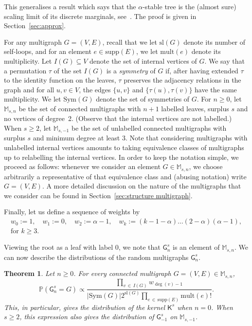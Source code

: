 \documentclass[10pt]{amsart}
\newtheorem{theo}{Theorem}[section]
\theoremstyle{definition}\newtheorem{defi}[theo]{Definition}\newtheorem{rema}[theo]{Remark}\newtheorem{exam}[theo]{Example}\newtheorem{exem}[theo]{Example}\newtheorem{nota}[theo]{Notation}
\newcommand{\abs}[1]{\left\lvert#1\right\rvert}
\newcommand{\Pp}[1]{\mathbb{P} \left(#1\right)}
\renewcommand{\subset}{\subseteq}
\newcommand{\supp}{\mathrm{supp}}
\newcommand{\sll}{\mathrm{sl}}
\newcommand{\Sym}{\mathrm{Sym}}
\newcommand{\mult}{\mathrm{mult}}
\newcommand{\sG}{\mathsf{G}}
\newcommand{\sK}{\mathsf{K}}
\newcommand{\M}{\mathbb{M}}
\begin{document}
This generalises a result which says that the $\alpha$-stable tree is the (almost sure) scaling limit of its discrete marginals, see~\cite{CurienHaas,Marchal}. The proof is given in Section~\ref{sec:approx}.

For any multigraph $G=(V,E)$, recall that we let $\sll(G)$ denote its number of self-loops, and for an element $e \in \supp(E)$, we let $\mult(e)$ denote its multiplicity. Let $I(G) \subset V$ denote the set of internal vertices of $G$. We say that a permutation $\tau$ of the set $I(G)$ is a \emph{symmetry} of $G$ if, after having extended $\tau$ to the identity function on the leaves, $\tau$ preserves the adjacency relations in the graph and for all $u,v \in V$, the edges $\{u,v\}$ and $\{\tau(u),\tau(v)\}$ have the same multiplicity. We let $\Sym(G)$ denote the set of symmetries of $G$. For $n \ge 0$, let $\M_{s,n}$ be the set of connected multigraphs with $n+1$ labelled leaves, surplus $s$ and no vertices of degree~2. (Observe that the internal vertices are not labelled.) When $s\geq 2$, let $\M_{s,-1}$ be the set of unlabelled connected multigraphs with surplus $s$ and minimum degree at least 3. Note that considering multigraphs with unlabelled internal vertices amounts to taking equivalence classes of multigraphs up to relabelling the internal vertices. In order to keep the notation simple, we proceed as follows: whenever we consider an element $G\in \M_{s,n}$, we choose arbitrarily a representative of that equivalence class and (abusing notation) write $G=(V,E)$. A more detailed discussion on the nature of the multigraphs that we consider can be found in Section~\ref{sec:structure multigraph}.

Finally, let us define a sequence of weights by
\begin{multline}\label{Marchal's weights}
w_0:=1, \quad w_1:=0, \quad w_2:=\alpha-1,\quad w_k:=(k-1-\alpha)\dots(2-\alpha)(\alpha-1), \\ \text{for }k\geq 3.
\end{multline}


Viewing the root as a leaf with label $0$, we note that $\sG_{n}^s$ is an element of $\M_{s,n}$. We can now describe the distributions of the random multigraphs $\sG_{n}^s$.


\begin{theo}\label{th:distr_marginals}
Let $n\geq0$. For every connected multigraph $G=(V,E) \in \M_{s,n}$,
\[
\Pp{\sG_{n}^s=G}\propto\frac{\prod\limits_{v\,\in\,I(G)} w_{\deg(v)-1}}{\abs{\Sym(G)}2^{\sll(G)}\prod\limits_{e\,\in\,\supp(E)}\mult(e)!}.
\]
This, in particular, gives the distribution of the kernel $\sK^s$ when $n=0$. When $s\geq 2$, this expression also gives the distribution of $\sG_{-1}^s$ on $\M_{s,-1}$.
\end{theo}
\end{document}

